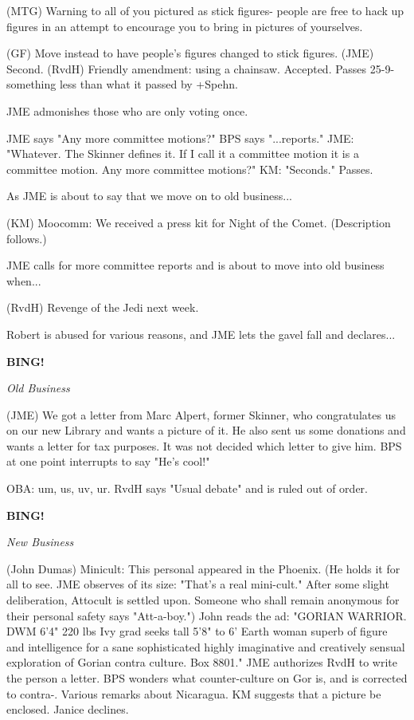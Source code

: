 \documentclass[12pt]{article}
\newcommand{\bing}{{\bf BING!} }
\newcommand{\goto}[1]{\bing \vskip 12pt \centerline{{\em{#1}}}}
\begin{document}
(MTG) Warning to all of you pictured as stick figures- people are free to hack up figures in an attempt to encourage you to bring in pictures of yourselves.

(GF) Move instead to have people's figures changed to stick figures. (JME) Second. (RvdH) Friendly amendment: using a chainsaw. Accepted. Passes 25-9-something less than what it passed by +Spehn.

JME admonishes those who are only voting once.

JME says "Any more committee motions?" BPS says "...reports." JME: "Whatever. The Skinner defines it. If I call it a committee motion it is a committee motion. Any more committee motions?" KM: "Seconds." Passes.

As JME is about to say that we move on to old business...

(KM) Moocomm: We received a press kit for Night of the Comet. (Description follows.)

JME calls for more committee reports and is about to move into old business when...

(RvdH) Revenge of the Jedi next week.

Robert is abused for various reasons, and JME lets the gavel fall and declares...

\goto{Old Business}

(JME) We got a letter from Marc Alpert, former Skinner, who congratulates us on our new Library and wants a picture of it. He also sent us some donations and wants a letter for tax purposes. It was not decided which letter to give him. BPS at one point interrupts to say "He's cool!"

OBA: um, us, uv, ur. RvdH says "Usual debate" and is ruled out of order.

\goto{New Business}

(John Dumas) Minicult: This personal appeared in the Phoenix. (He holds it for all to see. JME observes of its size: "That's a real mini-cult." After some slight deliberation, Attocult is settled upon. Someone who shall remain anonymous for their personal safety says "Att-a-boy.") John reads the ad: "GORIAN WARRIOR. DWM 6'4" 220 lbs Ivy grad seeks tall 5'8" to 6' Earth woman superb of figure and intelligence for a sane sophisticated highly imaginative and creatively sensual exploration of Gorian contra culture. Box 8801." JME authorizes RvdH to write the person a letter. BPS wonders what counter-culture on Gor is, and is corrected to contra-. Various remarks about Nicaragua. KM suggests that a picture be enclosed. Janice declines.
\end{document}
